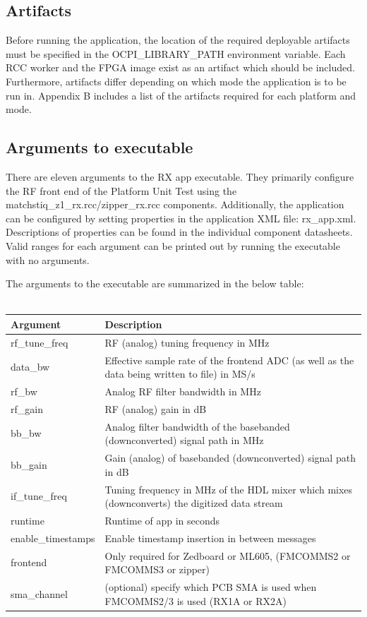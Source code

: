 \subsection{Artifacts}
\noindent Before running the application, the location of the required deployable artifacts must be specified in the OCPI\_LIBRARY\_PATH environment variable. Each RCC worker and the FPGA image exist as an artifact which should be included. Furthermore, artifacts differ depending on which mode the application is to be run in. Appendix B includes a list of the artifacts required for each platform and mode.
\newpage
\subsection{Arguments to executable}
\noindent There are eleven arguments to the RX app executable. They primarily configure the RF front end of the Platform Unit Test using the matchstiq\_z1\_rx.rcc/zipper\_rx.rcc components. Additionally, the application can be configured by setting properties in the application XML file: rx\_app.xml. Descriptions of properties can be found in the individual component datasheets. Valid ranges for each argument can be printed out by running the executable with no arguments.\par\medskip 

\noindent The arguments to the executable are summarized in the below table: \\ \\
	\begin{tabular}{|l|l|}
	\hline
	\rowcolor{blue}
	Argument & Description\\
	\hline
	rf\_tune\_freq & RF (analog) tuning frequency in MHz\\
	\hline
	data\_bw & Effective sample rate of the frontend ADC (as well as the data being written to file) in MS/s\\
	\hline
	rf\_bw & Analog RF filter bandwidth in MHz\\
	\hline
	rf\_gain & RF (analog) gain in dB\\
	\hline
	bb\_bw & Analog filter bandwidth of the basebanded (downconverted) signal path in MHz\\
	\hline
	bb\_gain & Gain (analog) of basebanded (downconverted) signal path in dB\\
	\hline
	if\_tune\_freq & Tuning frequency in MHz of the HDL mixer which mixes (downconverts) the digitized data stream\\
	\hline
	runtime & Runtime of app in seconds\\
	\hline
	enable\_timestamps & Enable timestamp insertion in between messages\\
	\hline
	frontend     & Only required for Zedboard or ML605, (FMCOMMS2 or FMCOMMS3 or zipper) \\
	\hline
	sma\_channel & (optional) specify which PCB SMA is used when FMCOMMS2/3 is used (RX1A or RX2A) \\
	\hline
	\end{tabular}
